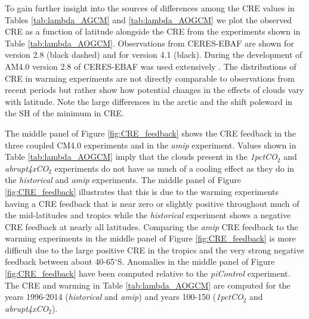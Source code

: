 \documentclass[draft]{agujournal2019}
\begin{document}
To gain further insight into the sources of differences among the CRE values in Tables  \ref{tab:lambda_AGCM}  and  
\ref{tab:lambda_AOGCM}  we plot the observed CRE as a function of latitude alongside the CRE from the 
experiments shown in Table  \ref{tab:lambda_AOGCM}.  Observations from CERES-EBAF are shown for version 
2.8 (black dashed) and for version 4.1 (black).  During the development of AM4.0 version 2.8 of CERES-EBAF was 
used extensively \cite{Zhao_etal_2018a}.  The distributions of CRE in warming experiments are not directly comparable 
to observations from recent periods but rather show how potential changes in the effects of clouds vary with latitude.   
Note the large differences in the arctic and the shift poleward in the SH of the minimum in CRE.    

The middle panel of Figure \ref{fig:CRE_feedback} shows the CRE feedback in the three coupled CM4.0 experiments and in the \textit{amip} experiment.  Values shown in Table \ref{tab:lambda_AOGCM} imply that the clouds present in the \textit{1pctCO$_2$} and \textit{abrupt4xCO$_2$} experiments
do not have as much of a cooling effect as they do in the \textit{historical} and \textit{amip} experiments.  The middle panel of Figure \ref{fig:CRE_feedback} illustrates that this is due to the warming experiments having a CRE feedback that is near zero or slightly positive throughout much of the mid-latitudes and tropics while the \textit{historical} experiment shows a negative CRE feedback at nearly all latitudes.  Comparing the \textit{amip} CRE feedback to the warming experiments in the 
middle panel of Figure \ref{fig:CRE_feedback} is more difficult due to the large positive CRE in the tropics and the very strong negative feedback between about 40-65$^{\circ}$S.  Anomalies in the middle panel of Figure \ref{fig:CRE_feedback} have been computed relative to the \textit{piControl} experiment.  The CRE and warming in Table \ref{tab:lambda_AOGCM} are 
computed for the years 1996-2014 (\textit{historical} and \textit{amip}) and years 100-150 (\textit{1pctCO$_2$} and \textit{abrupt4xCO$_2$}).   
\end{document}
